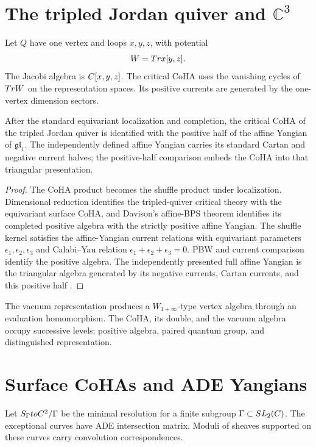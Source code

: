 \chapter{The tripled Jordan quiver and \texorpdfstring{$\mathbb C^3$}{C3}}
Let $Q$ have one vertex and loops $x,y,z$, with potential
\[
 W=Tr x[y,z].
\]
The Jacobi algebra is $C[x,y,z]$. The critical CoHA uses the vanishing cycles of $Tr W$ on the representation spaces. Its positive currents are generated by the one-vertex dimension sectors.

\begin{theorem}
After the standard equivariant localization and completion, the critical CoHA of the tripled Jordan quiver is identified with the positive half of the affine Yangian of $\mathfrak{gl}_1$. The independently defined affine Yangian carries its standard Cartan and negative current halves; the positive-half comparison embeds the CoHA into that triangular presentation.
\end{theorem}
\begin{proof}
The CoHA product becomes the shuffle product under localization. Dimensional reduction identifies the tripled-quiver critical theory with the equivariant surface CoHA, and Davison's affine-BPS theorem identifies its completed positive algebra with the strictly positive affine Yangian. The shuffle kernel satisfies the affine-Yangian current relations with equivariant parameters $\epsilon_1,\epsilon_2,\epsilon_3$ and Calabi--Yau relation $\epsilon_1+\epsilon_2+\epsilon_3=0$. PBW and current comparison identify the positive algebra. The independently presented full affine Yangian is the triangular algebra generated by its negative currents, Cartan currents, and this positive half \cite{DavisonAffineBPS,DavisonMeinhardt,SVYangians,Tsymbaliuk}.
\end{proof}

The vacuum representation produces a $W_{1+\infty}$-type vertex algebra through an evaluation homomorphism. The CoHA, its double, and the vacuum algebra occupy successive levels: positive algebra, paired quantum group, and distinguished representation.

\chapter{Surface CoHAs and ADE Yangians}
Let $S_\Gamma toC^2/\Gamma$ be the minimal resolution for a finite subgroup $\Gamma\subset SL_2(C)$. The exceptional curves have ADE intersection matrix. Moduli of sheaves supported on these curves carry convolution correspondences.


